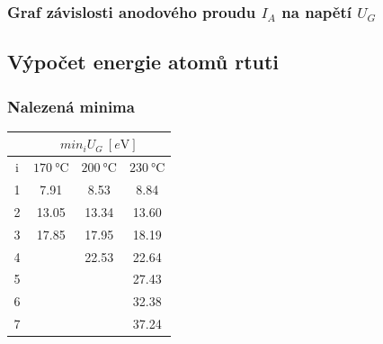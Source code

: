 \documentclass[titlepage]{article}
\begin{document}
\subsubsection{Graf závislosti anodového proudu $I_A$ na napětí $U_G$}

\begin{figure}[H]
    \centering
\end{figure}

\subsection{Výpočet energie atomů rtuti}
\subsubsection{Nalezená minima}
\begin{table}[H]
    \centering
    \begin{tabular}{c||c|c|c}
        ~ & \multicolumn{3}{c}{$min_i {U_G}\ [\si{e\volt}]$} \\ \hline
        i & $170\ \si{\celsius}$ & $200\ \si{\celsius}$ & $230\ \si{\celsius}$ \\ \hline\hline
        1 & 7.91 & 8.53 & 8.84 \\ \hline
        2 & 13.05 & 13.34 & 13.60 \\ \hline
        3 & 17.85 & 17.95 & 18.19 \\ \hline
        4 & ~ & 22.53 & 22.64 \\ \hline
        5 & ~ & ~ & 27.43 \\ \hline
        6 & ~ & ~ & 32.38 \\ \hline
        7 & ~ & ~ & 37.24
    \end{tabular}
\end{table}
\end{document}
